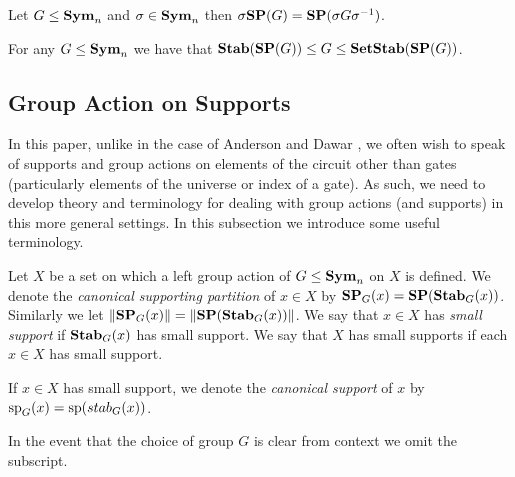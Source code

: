 \documentclass[../paper.tex]{subfiles}
\begin{document}
\begin{lem}
  \label{lem:SP_conjugation}
  Let $G \leq \text{\textbf{Sym}}_n$ and $\sigma \in \text{\textbf{Sym}}_n$ then $\sigma \text{\textbf{SP}} (G) = \text{\textbf{SP}}(\sigma
  G \sigma^{-1})$.
\end{lem}

\begin{lem}
  For any $G \leq \text{\textbf{Sym}}_n$ we have that $\text{\textbf{Stab}} (\text{\textbf{SP}} (G)) \leq G \leq
  \text{\textbf{SetStab}}(\text{\textbf{SP}}(G))$.
\end{lem}

\subsection{Group Action on Supports}
In this paper, unlike in the case of Anderson and Dawar \cite{AndersonD17}, we
often wish to speak of supports and group actions on elements of the circuit
other than gates (particularly elements of the universe or index of a gate). As
such, we need to develop theory and terminology for dealing with group actions
(and supports) in this more general settings. In this subsection we introduce
some useful terminology.

\begin{definition}
  Let $X$ be a set on which a left group action of $G \leq \text{\textbf{Sym}}_n$ on $X$ is
  defined. We denote the \emph{canonical supporting partition} of $x \in X$ by
  $\text{\textbf{SP}}_G (x) = \text{\textbf{SP}} (\text{\textbf{Stab}}_G(x))$. Similarly we let $\| \text{\textbf{SP}}_G (x) \| = \| \text{\textbf{SP}}
  (\text{\textbf{Stab}}_G(x)) \|$. We say that $x \in X$ has \emph{small support} if
  $\text{\textbf{Stab}}_G(x)$ has small support. We say that $X$ has small supports if each $x
  \in X$ has small support.

  If $x \in X$ has small support, we denote the \emph{canonical support} of $x$
  by $\text{sp}_G(x) = \text{sp} (stab_G(x))$.

  In the event that the choice of group $G$ is clear from context we omit the
  subscript.
\end{definition}
\end{document}
